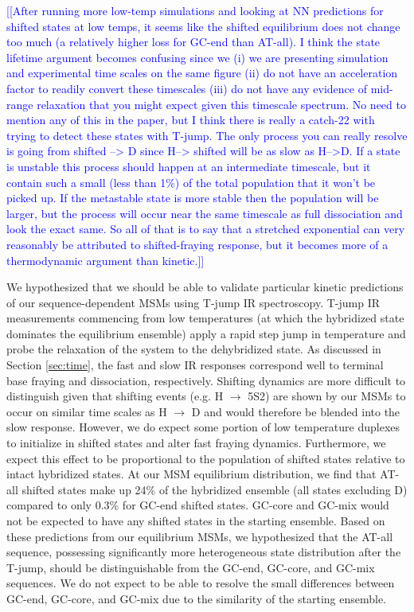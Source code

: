 \documentclass[journal=jpcbfk,manuscript=article]{achemso}
\newcommand*{\noteb}[1]{\textcolor{blue}{[[#1]]}}		%
\begin{document}
\noteb{After running more low-temp simulations and looking at NN predictions for shifted states at low temps, it seems like the shifted equilibrium does not change too much (a relatively higher loss for GC-end than AT-all). I think the state lifetime argument becomes confusing since we (i) we are presenting simulation and experimental time scales on the same figure (ii) do not have an acceleration factor to readily convert these timescales (iii) do not have any evidence of mid-range relaxation that you might expect given this timescale spectrum. No need to mention any of this in the paper, but I think there is really a catch-22 with trying to detect these states with T-jump. The only process you can really resolve is going from shifted --> D since H--> shifted will be as slow as H-->D. If a state is unstable this process should happen at an intermediate timescale, but it contain such a small (less than 1\%) of the total population that it won't be picked up. If the metastable state is more stable then the population will be larger, but the process will occur near the same timescale as full dissociation and look the exact same.  So all of that is to say that a stretched exponential can very reasonably be attributed to shifted-fraying response, but it becomes more of a thermodynamic argument than kinetic.}

We hypothesized that we should be able to validate particular kinetic predictions of our sequence-dependent MSMs using T-jump IR spectroscopy. T-jump IR measurements commencing from low temperatures (at which the hybridized state dominates the equilibrium ensemble) apply a rapid step jump in temperature and probe the relaxation of the system to the dehybridized state. As discussed in Section \ref{sec:time}, the fast and slow IR responses correspond well to terminal base fraying and dissociation, respectively. Shifting dynamics are more difficult to distinguish given that shifting events (e.g. H $\rightarrow$ 5S2) are shown by our MSMs to occur on similar time scales as H $\rightarrow$ D and would therefore be blended into the slow response. However, we do expect some portion of low temperature duplexes to initialize in shifted states and alter fast fraying dynamics. Furthermore, we expect this effect to be proportional to the population of shifted states relative to intact hybridized states. At our MSM equilibrium distribution, we find that AT-all shifted states make up 24\% of the hybridized ensemble (all states excluding D) compared to only 0.3\% for GC-end shifted states. GC-core and GC-mix would not be expected to have any shifted states in the starting ensemble. Based on these predictions from our equilibrium MSMs, we hypothesized that the AT-all sequence, possessing significantly more heterogeneous state distribution after the T-jump, should be distinguishable from the GC-end, GC-core, and GC-mix sequences. We do not expect to be able to resolve the small differences between GC-end, GC-core, and GC-mix due to the similarity of the starting ensemble.
\end{document}
